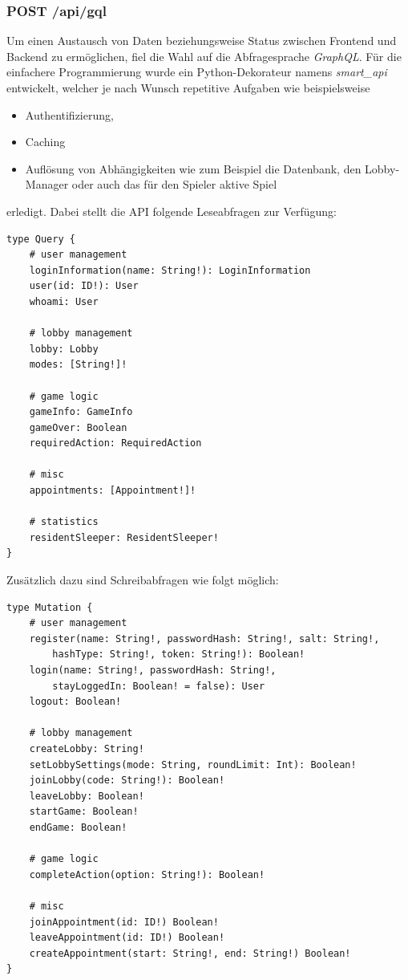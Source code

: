 \subsubsection{POST /api/gql}
Um einen Austausch von Daten beziehungsweise Status zwischen Frontend und Backend zu ermöglichen, fiel die Wahl auf die Abfragesprache \textit{GraphQL}. Für die einfachere Programmierung wurde ein Python-Dekorateur namens \textit{smart\_api} entwickelt, welcher je nach Wunsch repetitive Aufgaben wie beispielsweise 
\begin{itemize}
	\item Authentifizierung, 
	\item Caching
	\item Auflösung von Abhängigkeiten wie zum Beispiel die Datenbank, den Lobby-Manager oder auch das für den Spieler aktive Spiel
\end{itemize}
erledigt. Dabei stellt die API folgende Leseabfragen zur Verfügung:

\begin{lstlisting}
type Query {
	# user management
	loginInformation(name: String!): LoginInformation
	user(id: ID!): User
	whoami: User
	
	# lobby management
	lobby: Lobby
	modes: [String!]!
	
	# game logic
	gameInfo: GameInfo
	gameOver: Boolean
	requiredAction: RequiredAction
	
	# misc
	appointments: [Appointment!]!
	
	# statistics
	residentSleeper: ResidentSleeper!
}
\end{lstlisting}

Zusätzlich dazu sind Schreibabfragen wie folgt möglich:

\begin{lstlisting}
type Mutation {
	# user management
	register(name: String!, passwordHash: String!, salt: String!, 
		hashType: String!, token: String!): Boolean!
	login(name: String!, passwordHash: String!, 
		stayLoggedIn: Boolean! = false): User
	logout: Boolean!
	
	# lobby management
	createLobby: String!
	setLobbySettings(mode: String, roundLimit: Int): Boolean!
	joinLobby(code: String!): Boolean!
	leaveLobby: Boolean!
	startGame: Boolean!
	endGame: Boolean!
	
	# game logic
	completeAction(option: String!): Boolean!
	
	# misc
	joinAppointment(id: ID!) Boolean!
	leaveAppointment(id: ID!) Boolean!
	createAppointment(start: String!, end: String!) Boolean!
}
\end{lstlisting}

